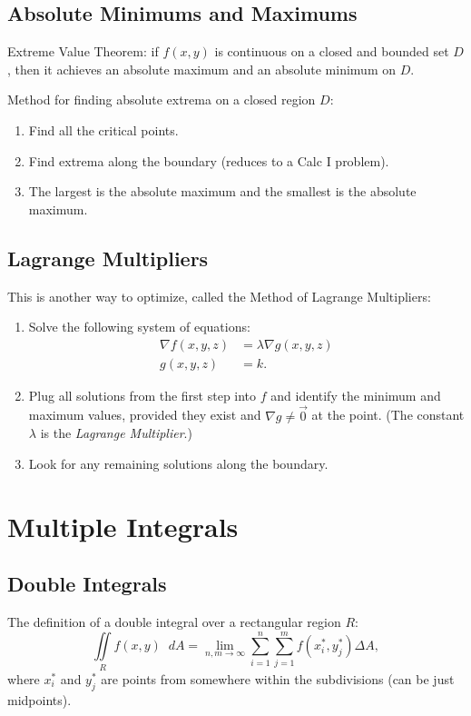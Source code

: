 \documentclass[12pt]{article}
\newcommand{\dd}{\mathop{}\!d}
\theoremstyle{definition}
\begin{document}
\subsection{Absolute Minimums and Maximums}
Extreme Value Theorem: if $f(x, y)$ is continuous on a closed and bounded set $D$, then it achieves an absolute maximum and an absolute minimum on $D$.

Method for finding absolute extrema on a closed region $D$: \begin{enumerate}
	\item Find all the critical points.
	\item Find extrema along the boundary (reduces to a Calc I problem).
	\item The largest is the absolute maximum and the smallest is the absolute maximum.
\end{enumerate}

\subsection{Lagrange Multipliers}
This is another way to optimize, called the Method of Lagrange Multipliers: \begin{enumerate}
	\item Solve the following system of equations: \begin{align*}
		      \nabla f(x, y, z) & = \lambda\nabla g(x, y, z) \\
		      g(x, y, z)        & = k.
	      \end{align*}
	\item Plug all solutions from the first step into $f$ and identify the minimum and maximum values, provided they exist and $\nabla g \neq \vec{0}$ at the point.
	      (The constant $\lambda$ is the \textit{Lagrange Multiplier}.)
	\item Look for any remaining solutions along the boundary.
\end{enumerate}

\section{Multiple Integrals}

\subsection{Double Integrals}
The definition of a double integral over a rectangular region $R$: \begin{equation*}
	\iint\limits_R f(x, y) \dd A = \lim_{n,m\to\infty} \sum_{i=1}^n\sum_{j=1}^m f(x_i^*, y_j^*) \Delta A,
\end{equation*}
where $x_i^*$ and $y_j^*$ are points from somewhere within the subdivisions (can be just midpoints).
\end{document}

